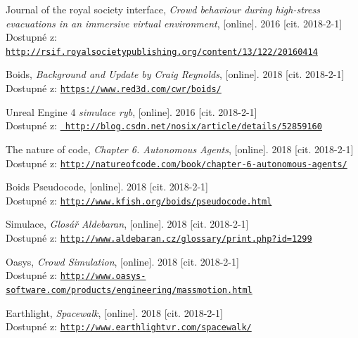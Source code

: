 \documentclass[czech,public,dept460,male,cpdeclaration]{diploma}
\begin{document}
\begin{thebibliography}{99}
	
	 Journal of the royal society interface, 
		\textit{Crowd behaviour during high-stress evacuations in an immersive virtual environment}, [online]. 2016 [cit. 2018-2-1]\\
		Dostupné z: \href{http://rsif.royalsocietypublishing.org/content/13/122/20160414}{\texttt{http://rsif.royalsocietypublishing.org/content/13/122/20160414}}
	
	 Boids, 
		\textit{Background and Update by Craig Reynolds}, [online]. 2018 [cit. 2018-2-1]\\
		Dostupné z: \href{https://www.red3d.com/cwr/boids/}{\texttt{https://www.red3d.com/cwr/boids/}}
	
	 Unreal Engine 4 \textit{simulace ryb}, [online]. 2016 [cit. 2018-2-1]\\
		Dostupné z: \href{		http://blog.csdn.net/nosix/article/details/52859160}{\texttt{		http://blog.csdn.net/nosix/article/details/52859160}}
	
	 The nature of code, 
		\textit{Chapter 6. Autonomous Agents}, [online]. 2018 [cit. 2018-2-1]\\
		Dostupné z: \href{http://natureofcode.com/book/chapter-6-autonomous-agents/}{\texttt{http://natureofcode.com/book/chapter-6-autonomous-agents/}}

	 Boids Pseudocode, 
		[online]. 2018 [cit. 2018-2-1]\\
		Dostupné z: \href{http://www.kfish.org/boids/pseudocode.html}{\texttt{http://www.kfish.org/boids/pseudocode.html}}
		
	 Simulace,
		\textit{Glosář Aldebaran}, [online]. 2018 [cit. 2018-2-1]\\
		Dostupné z: \href{http://www.aldebaran.cz/glossary/print.php?id=1299}{\texttt{http://www.aldebaran.cz/glossary/print.php?id=1299}}
		
	 Oasys,
		\textit{Crowd Simulation}, [online]. 2018 [cit. 2018-2-1]\\
		Dostupné z: \href{http://www.oasys-software.com/products/engineering/massmotion.html}{\texttt{http://www.oasys-software.com/products/engineering/massmotion.html}}
		
	 Earthlight,
		\textit{Spacewalk}, [online]. 2018 [cit. 2018-2-1]\\
		Dostupné z: \href{http://www.earthlightvr.com/spacewalk/}{\texttt{http://www.earthlightvr.com/spacewalk/}}
		

\end{thebibliography}
\end{document}
